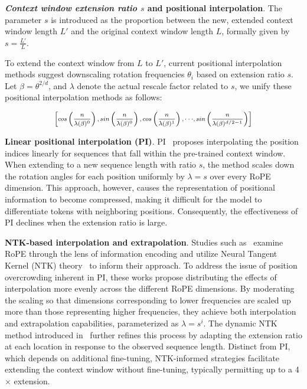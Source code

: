 \textbf{\emph{Context window extension ratio $s$} and positional interpolation}. The parameter $s$ is introduced as the proportion between the new, extended context window length $L'$ and the original context window length $L$, formally given by $s=\frac{L'}{L}$.

To extend the context window from $L$ to $L'$, current positional interpolation methods suggest downscaling rotation frequencies $\theta_i$ based on extension ratio $s$. Let $\beta=\theta^{2/d}$, and $\lambda$ denote the actual rescale factor related to $s$, we   unify these positional interpolation methods as follows:

\begin{equation}	
	\fontsize{7.5}{7.5} \selectfont
	\label{eq:unified_rope}
	\begin{aligned}
		\left[cos\left(\frac{n}{\lambda(\beta)^0}\right), sin \left(\frac{n}{\lambda(\beta)^0}\right), cos\left(\frac{n}{\lambda(\beta)^1}\right), \cdot\cdot\cdot,  sin \left(\frac{n}{\lambda(\beta)^{d/2-1}}\right) \right]   
	\end{aligned}
\end{equation}

\textbf{Linear positional interpolation (PI)}. PI~\cite{pi} proposes interpolating the position indices linearly for sequences that fall within the pre-trained context window. When extending to a new sequence length with ratio $s$, the method scales down the rotation angles for each position uniformly by $\lambda=s$ over every RoPE dimension. This approach, however, causes the representation of positional information to become compressed, making it difficult for the model to differentiate tokens with neighboring positions. Consequently, the effectiveness of PI declines when the extension ratio is large.

\textbf{NTK-based interpolation and extrapolation}. Studies such as~\cite{ntk,dynamicntk} examine RoPE through the lens of information encoding and utilize Neural Tangent Kernel (NTK) theory~\cite{jacot2018neural,tancik2020fourier} to inform their approach. To address the issue of position overcrowding inherent in PI, these works propose distributing the effects of interpolation more evenly across the different RoPE dimensions. By moderating the scaling so that dimensions corresponding to lower frequencies are scaled up more than those representing higher frequencies, they achieve both interpolation and extrapolation capabilities, parameterized as $\lambda=s^{i}$. The dynamic NTK method introduced in~\cite{dynamicntk} further refines this process by adapting the extension ratio at each location in response to the observed sequence length. Distinct from PI, which depends on additional fine-tuning, NTK-informed strategies facilitate extending the context window without fine-tuning, typically permitting up to a 4$\times$ extension.

